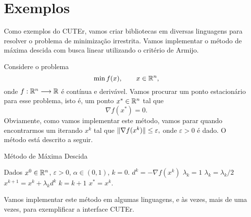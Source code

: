 \section{Exemplos}
Como exemplos do CUTEr, vamos criar bibliotecas em diversas linguagens para resolver o 
problema de minimização irrestrita. 
Vamos implementar o método de máxima descida com busca linear utilizando o
critério de Armijo.

Considere o problema
\begin{equation}
 \min f(x), \qquad x \in \mathbb{R}^{n},
\end{equation}
onde $f:\mathbb{R}^{n}\longrightarrow\mathbb{R}$ é contínua e derivável. Vamos procurar um ponto estacionário para esse
problema, isto é, um ponto $x^* \in \mathbb{R}^{n}$ tal que $$\nabla f(x^*) = 0.$$
Obviamente, como vamos implementar este método, vamos parar quando encontrarmos um
iterando $x^k$ tal que $\Vert \nabla f(x^k)\Vert \leq \varepsilon,$ onde $\varepsilon > 0$ é
dado. O método está descrito a seguir.
\begin{algorithm}[H]
\caption{Método de Máxima Descida}
 \begin{algorithmic}[1]
 \State Dados $x^0 \in \mathbb{R}^{n}$, $\varepsilon > 0$, $\alpha \in (0,1)$, $k = 0$.
  \State $d^k = -\nabla f(x^k)$
  \State $\lambda_k = 1$
   \State $\lambda_k = \lambda_k/2$
  \EndWhile
  \State $x^{k+1} = x^k + \lambda_kd^k$
  \State $k = k + 1$
 \EndWhile
 \State $x^* = x^k$.
 \end{algorithmic}
\end{algorithm}
Vamos implementar este método em algumas linguagens, e às vezes, mais de uma vezes, para
exemplificar a interface CUTEr.






